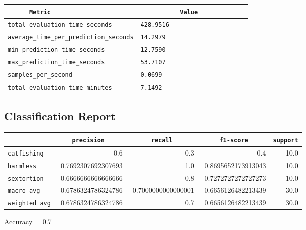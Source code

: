 \documentclass{article}
\begin{document}
\begin{center}
\begin{tabular}{l | l} \hline
    \verb|      Metric     | & \verb|           Value           | \\ \hline
    \hline
    \verb|total_evaluation_time_seconds| & \verb|428.9516                     | \\ \hline
    \verb|average_time_per_prediction_seconds| & \verb|14.2979                      | \\ \hline
    \verb|min_prediction_time_seconds| & \verb|12.7590                      | \\ \hline
    \verb|max_prediction_time_seconds| & \verb|53.7107                      | \\ \hline
    \verb|samples_per_second| & \verb|0.0699                       | \\ \hline
    \verb|total_evaluation_time_minutes| & \verb|7.1492                       | \\ \hline
\end{tabular}
\end{center}

\subsection{Classification Report}

\begin{center}
\begin{tabular}{l | r | r | r | r} \hline
    \verb|            | & \verb|    precision     | & \verb|      recall      | & \verb|     f1-score     | & \verb|support| \\ \hline
    \hline
    \verb|catfishing | & 0.6 & 0.3 & 0.4 &    10.0 \\ \hline
    \verb|harmless   | & 0.7692307692307693 & 1.0 & 0.8695652173913043 &    10.0 \\ \hline
    \verb|sextortion | & 0.6666666666666666 & 0.8 & 0.7272727272727273 &    10.0 \\ \hline
    \verb|macro avg  | & 0.6786324786324786 & 0.7000000000000001 & 0.6656126482213439 &    30.0 \\ \hline
    \verb|weighted avg| & 0.6786324786324786 & 0.7 & 0.6656126482213439 &    30.0 \\ \hline
\end{tabular}
\end{center}

\begin{center}
Accuracy = 0.7
\end{center}
\end{document}
